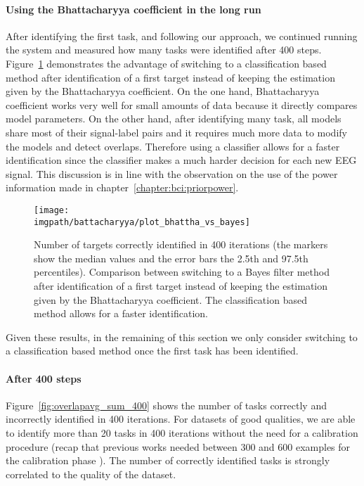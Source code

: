 \paragraph{Using the Bhattacharyya coefficient in the long run}

After identifying the first task, and following our approach, we continued running the system and measured how many tasks were identified after 400 steps. Figure~\ref{fig:overlapbhatta} demonstrates the advantage of switching to a classification based method after identification of a first target instead of keeping the estimation given by the Bhattacharyya coefficient. On the one hand, Bhattacharyya coefficient works very well for small amounts of data because it directly compares model parameters. On the other hand, after identifying many task, all models share most of their signal-label pairs and it requires much more data to modify the models and detect overlaps. Therefore using a classifier allows for a faster identification since the classifier makes a much harder decision for each new EEG signal. This discussion is in line with the observation on the use of the power information made in chapter~\ref{chapter:bci:priorpower}.

\begin{figure}[!htbp]
    \centering
        \texttt{[image: \\imgpath/battacharyya/plot\_bhattha\_vs\_bayes]}
        \caption{Number of targets correctly identified in 400 iterations (the markers show the median values and the error bars the 2.5th and 97.5th percentiles). Comparison between switching to a Bayes filter method after identification of a first target instead of keeping the estimation given by the Bhattacharyya coefficient. The classification based method allows for a faster identification.}
        \label{fig:overlapbhatta}
\end{figure} 

Given these results, in the remaining of this section we only consider switching to a classification based method once the first task has been identified.

\paragraph{After 400 steps}

Figure~\ref{fig:overlapavg_sum_400} shows the number of tasks correctly and incorrectly identified in 400 iterations. For datasets of good qualities, we are able to identify more than 20 tasks in 400 iterations without the need for a calibration procedure (recap that previous works needed between 300 and 600 examples for the calibration phase \cite{chavarriaga2010learning,iturrate2010single}). The number of correctly identified tasks is strongly correlated to the quality of the dataset.

